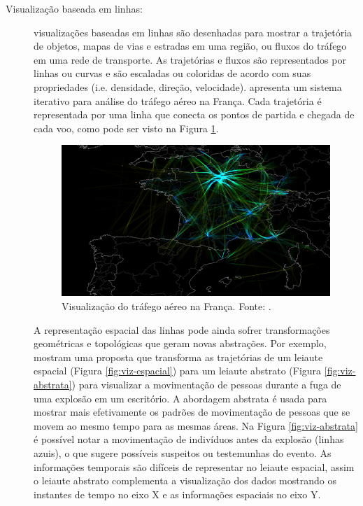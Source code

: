 \begin{description}
  \item[Visualização baseada em linhas:] visualizações baseadas em linhas são
desenhadas para mostrar a trajetória de objetos, mapas de vias e estradas em
uma região, ou fluxos do tráfego em uma rede de transporte. As trajetórias e
fluxos são representados por linhas ou curvas e são escaladas ou coloridas de
acordo com suas propriedades (i.e. densidade, direção, velocidade).
\citet{Klein2013} apresenta um sistema iterativo para análise do tráfego aéreo
na França. Cada trajetória é representada por uma linha que conecta os pontos
de partida e chegada de cada voo, como pode ser visto na Figura
\ref{fig:air-traffic}.

\begin{figure}[!htb]
  \centering
  \includegraphics[width=1\textwidth]{../figuras/air-traffic.png}
  \caption[Visualização do tráfego aéreo na França]{Visualização do tráfego aéreo na França. Fonte: \citet{Klein2013}.}
  \label{fig:air-traffic}
\end{figure}

  A representação espacial das linhas pode ainda sofrer transformações
geométricas e topológicas que geram novas abstrações. Por exemplo,
\citet{Tarik2009} mostram uma proposta que transforma as trajetórias de um
leiaute espacial (Figura \ref{fig:viz-espacial}) para um leiaute abstrato
(Figura \ref{fig:viz-abstrata}) para visualizar a movimentação de pessoas
durante a fuga de uma explosão em um escritório.  A abordagem abstrata é usada
para mostrar mais efetivamente os padrões de movimentação de pessoas que se
movem ao mesmo tempo para as mesmas áreas. Na Figura \ref{fig:viz-abstrata} é
possível notar a movimentação de indivíduos antes da explosão (linhas azuis), o
que sugere possíveis suspeitos ou testemunhas do evento.  As informações
temporais são difíceis de representar no leiaute espacial, assim o leiaute
abstrato complementa a visualização dos dados mostrando os instantes de tempo
no eixo X e as informações espaciais no eixo Y.


\end{description}
